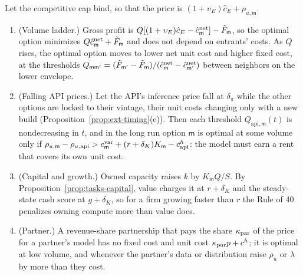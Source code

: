 \begin{proposition}\label{prop:prod-model}
Let the competitive cap bind, so that the price is $(1+\upsilon_E)\hat c_E+\rho_{u,\mathsf m}$.
\begin{enumerate}
\item[(a)] (Volume ladder.) Gross profit is $Q[(1+\upsilon_E)\hat c_E-\hat c^{\rm net}_{\mathsf m}]-\tilde F_{\mathsf m}$, so the optimal option minimizes $Q\hat c^{\rm net}_{\mathsf m}+\tilde F_{\mathsf m}$ and does not depend on entrants' costs. As $Q$ rises, the optimal option moves to lower net unit cost and higher fixed cost, at the thresholds $Q_{\mathsf m\mathsf m'}=(\tilde F_{\mathsf m'}-\tilde F_{\mathsf m})/(\hat c^{\rm net}_{\mathsf m}-\hat c^{\rm net}_{\mathsf m'})$ between neighbors on the lower envelope.
\item[(b)] (Falling API prices.) Let the API's inference price fall at $\delta_\pi$ while the other options are locked to their vintage, their unit costs changing only with a new build (Proposition~\ref{prop:ext-timing}(e)). Then each threshold $Q_{\mathrm{api},\mathsf m}(t)$ is nondecreasing in $t$, and in the long run option $\mathsf m$ is optimal at some volume only if $\rho_{u,\mathsf m}-\rho_{u,\mathrm{api}}>c^{\rm var}_{\mathsf m}+(r+\delta_K)K_{\mathsf m}-c^h_{\mathrm{api}}$: the model must earn a rent that covers its own unit cost.
\item[(c)] (Capital and growth.) Owned capacity raises $k$ by $K_{\mathsf m}Q/S$. By Proposition~\ref{prop:tasks-capital}, value charges it at $r+\delta_K$ and the steady-state cash score at $g+\delta_K$, so for a firm growing faster than $r$ the Rule of 40 penalizes owning compute more than value does.
\item[(d)] (Partner.) A revenue-share partnership that pays the share $\kappa_{\rm par}$ of the price for a partner's model has no fixed cost and unit cost $\kappa_{\rm par}p+c^h$; it is optimal at low volume, and whenever the partner's data or distribution raise $\rho_u$ or $\lambda$ by more than they cost.
\end{enumerate}
\end{proposition}

